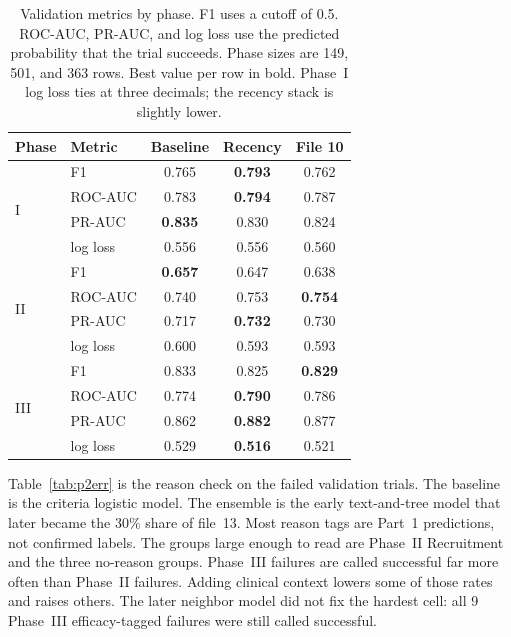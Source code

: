 \begin{table}[t]
\centering\small
\setlength{\tabcolsep}{2.5pt}
\begin{tabular}{llccc}
\toprule
Phase & Metric & Baseline & Recency & File 10 \\
\midrule
\multirow{4}{*}{I}
 & F1       & 0.765 & \textbf{0.793} & 0.762 \\
 & ROC-AUC  & 0.783 & \textbf{0.794} & 0.787 \\
 & PR-AUC   & \textbf{0.835} & 0.830 & 0.824 \\
 & log loss & 0.556 & 0.556 & 0.560 \\
\midrule
\multirow{4}{*}{II}
 & F1       & \textbf{0.657} & 0.647 & 0.638 \\
 & ROC-AUC  & 0.740 & 0.753 & \textbf{0.754} \\
 & PR-AUC   & 0.717 & \textbf{0.732} & 0.730 \\
 & log loss & 0.600 & 0.593 & 0.593 \\
\midrule
\multirow{4}{*}{III}
 & F1       & 0.833 & 0.825 & \textbf{0.829} \\
 & ROC-AUC  & 0.774 & \textbf{0.790} & 0.786 \\
 & PR-AUC   & 0.862 & \textbf{0.882} & 0.877 \\
 & log loss & 0.529 & \textbf{0.516} & 0.521 \\
\bottomrule
\end{tabular}
\caption{Validation metrics by phase. F1 uses a cutoff of 0.5. ROC-AUC,
PR-AUC, and log loss use the predicted probability that the trial succeeds.
Phase sizes are 149, 501, and 363 rows. Best value per row in bold. Phase~I
log loss ties at three decimals; the recency stack is slightly lower.}
\label{tab:p2phase}
\end{table}

Table~\ref{tab:p2err} is the reason check on the failed validation trials.
The baseline is the criteria logistic model. The ensemble is the early
text-and-tree model that later became the 30\% share of file~13. Most reason
tags are Part~1 predictions, not confirmed labels. The groups large enough
to read are Phase~II Recruitment and the three no-reason groups. Phase~III
failures are called successful far more often than Phase~II failures. Adding
clinical context lowers some of those rates and raises others. The later
neighbor model did not fix the hardest cell: all 9 Phase~III efficacy-tagged
failures were still called successful.

